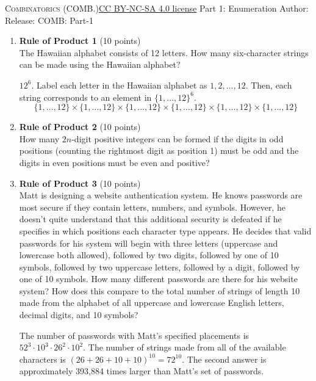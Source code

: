 \newpage\handout
{\textsc{Combinatorics (COMB.)}}{\href{https://creativecommons.org/licenses/by-nc-sa/4.0/}{CC BY-NC-SA 4.0 license}}
{Part 1: Enumeration}
{Author: \HandoutAuthor}{Release: \generatedOn}
{COMB: Part-1}

\newpage





\begin{enumerate}
  \item \textbf{Rule of Product 1} (10 points)\\
  The Hawaiian alphabet consists of 12 letters. How many six-character strings can be made using the Hawaiian alphabet?
  \begin{subanswer}
    $12^6$. Label each letter in the Hawaiian alphabet as $1,2,\ldots,12$. Then, each string corresponds to an element in $\{1,\ldots,12\}^6$.
    $$
    \{1, \ldots, 12\} \times\{1, \ldots, 12\} \times\{1, \ldots, 12\} \times\{1, \ldots, 12\} \times\{1, \ldots, 12\} \times\{1, \ldots, 12\}
    $$
  \end{subanswer}

  \item \textbf{Rule of Product 2} (10 points)\\
  How many $2n$-digit positive integers can be formed if the digits in odd positions (counting the rightmost digit as position 1) must be odd and the digits in even positions must be even and positive?
  \begin{subanswer}
  \end{subanswer}

  \item \textbf{Rule of Product 3} (10 points)\\
  Matt is designing a website authentication system. He knows passwords are most secure if they contain letters, numbers, and symbols. However, he doesn't quite understand that this additional security is defeated if he specifies in which positions each character type appears. He decides that valid passwords for his system will begin with three letters (uppercase and lowercase both allowed), followed by two digits, followed by one of 10 symbols, followed by two uppercase letters, followed by a digit, followed by one of 10 symbols. How many different passwords are there for his website system? How does this compare to the total number of strings of length 10 made from the alphabet of all uppercase and lowercase English letters, decimal digits, and 10 symbols?
  \begin{subanswer}
    The number of passwords with Matt's specified placements is $52^3 \cdot 10^3 \cdot 26^2 \cdot 10^2$. The number of strings made from all of the available characters is $(26+26+10+10)^{10} = 72^{10}$. The second answer is approximately 393,884 times larger than Matt's set of passwords.
  \end{subanswer}


\end{enumerate}
